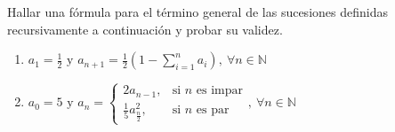 \begin{enunciado}{\ejercicio}
    Hallar una fórmula para el término general de las sucesiones definidas recursivamente a continuación
    y probar su validez.
    \begin{enumerate}[label=\roman*)]
        \item $a_1 = \displaystyle \frac{1}{2} \text{ y } a_{n+1} = \frac{1}{2}\left(1 - \sum_{i=1}^{n}a_i\right),\ 
        \forall n \in \mathbb{N}$
        \item $a_0 = 5 \text{ y } 
        a_n = 
        \begin{cases}
            2a_{n-1}, &\text{si $n$ es impar} \\
            \displaystyle \frac{1}{5}a^2_{\frac{n}{2}}, &\text{si $n$ es par}
        \end{cases}
        ,\ \forall n \in \mathbb{N}$
    \end{enumerate}
\end{enunciado}

